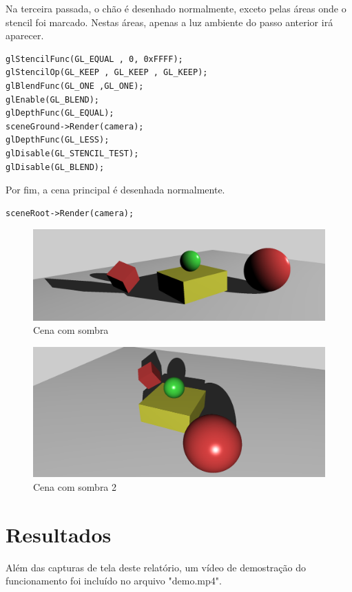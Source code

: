\documentclass[11pt, a4paper]{article}
\begin{document}
Na terceira passada, o chão é desenhado normalmente, exceto pelas áreas onde o 
stencil foi marcado. Nestas áreas, apenas a luz ambiente do passo anterior irá 
aparecer.

\begin{verbatim}
glStencilFunc(GL_EQUAL , 0, 0xFFFF);
glStencilOp(GL_KEEP , GL_KEEP , GL_KEEP);
glBlendFunc(GL_ONE ,GL_ONE);
glEnable(GL_BLEND);
glDepthFunc(GL_EQUAL);
sceneGround->Render(camera);
glDepthFunc(GL_LESS);
glDisable(GL_STENCIL_TEST);
glDisable(GL_BLEND);
\end{verbatim}

Por fim, a cena principal é desenhada normalmente.

\begin{verbatim}
sceneRoot->Render(camera);
\end{verbatim}

\begin{figure}[H]
  \begin{center}
  \includegraphics[width=0.8\linewidth]{shadow.png}
  \caption{Cena com sombra}
  \label{fig:vaz}
  \end{center}
\end{figure}

\begin{figure}[H]
  \begin{center}
  \includegraphics[width=0.8\linewidth]{shadow-2.png}
  \caption{Cena com sombra 2}
  \label{fig:vaz}
  \end{center}
\end{figure}

\section {Resultados}

Além das capturas de tela deste relatório, um vídeo de demostração do funcionamento 
foi incluído no arquivo "demo.mp4".
\end{document}
